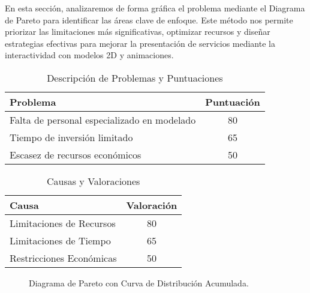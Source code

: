 En esta sección, analizaremos de forma gráfica el problema mediante el Diagrama
de Pareto para identificar las áreas clave de enfoque. Este método nos permite
priorizar las limitaciones más significativas, optimizar recursos y diseñar
estrategias efectivas para mejorar la presentación de servicios mediante la
interactividad con modelos 2D y animaciones.

\begin{table}[ht]
  \centering
  \caption{Descripción de Problemas y Puntuaciones}
  \begin{tabularx}{0.8\linewidth}{X c}
    \toprule
    \textbf{Problema} & \textbf{Puntuación} \\
    \midrule
    Falta de personal especializado en modelado & 80 \\
    Tiempo de inversión limitado & 65 \\
    Escasez de recursos económicos & 50 \\
    \bottomrule
  \end{tabularx}
\end{table}

\begin{table}[ht]
  \centering
  \caption{Causas y Valoraciones}
  \begin{tabularx}{0.8\linewidth}{X c}
    \toprule
    \textbf{Causa} & \textbf{Valoración} \\
    \midrule
    Limitaciones de Recursos & 80 \\
    Limitaciones de Tiempo & 65 \\
    Restricciones Económicas & 50 \\
    \bottomrule
  \end{tabularx}
\end{table}



\begin{figure}[ht]
  \centering
  \caption{Diagrama de Pareto con Curva de Distribución Acumulada.}
\end{figure}

